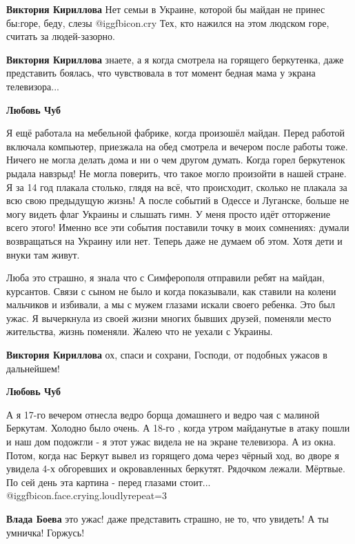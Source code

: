 \begin{itemize}
\begin{itemize}
\textbf{Виктория Кириллова} Нет семьи в Украине, которой бы майдан не принес бы:горе, беду, слезы @igg{fbicon.cry} Тех, кто нажился на этом людском горе, считать за людей-зазорно.

\textbf{Виктория Кириллова} знаете, а я когда смотрела на горящего беркутенка, даже представить боялась, что чувствовала в тот момент бедная мама у экрана телевизора...

\textbf{Любовь Чуб} 

Я ещё работала на мебельной фабрике, когда произошёл майдан. Перед работой
включала компьютер, приезжала на обед смотрела и вечером после работы тоже.
Ничего не могла делать дома и ни о чем другом думать. Когда горел беркутенок
рыдала навзрыд! Не могла поверить, что такое могло произойти в нашей стране. Я
за 14 год плакала столько, глядя на всё, что происходит, сколько не плакала за
всю свою предыдущую жизнь! А после событий в Одессе и Луганске, больше не могу
видеть флаг Украины и слышать гимн. У меня просто идёт отторжение всего этого!
Именно все эти события поставили точку в моих сомнениях: думали возвращаться на
Украину или нет. Теперь даже не думаем об этом. Хотя дети и внуки там живут.


Люба это страшно, я знала что с Симферополя отправили ребят на
майдан, курсантов. Связи с сыном не было и когда показывали, как ставили на
колени мальчиков и избивали, а мы с мужем глазами искали своего ребенка. Это был
ужас. Я вычеркнула из своей жизни многих бывших друзей, поменяли место
жительства, жизнь поменяли. Жалею что не уехали с Украины.

\textbf{Виктория Кириллова} ох, спаси и сохрани, Господи, от подобных ужасов в дальнейшем!

\textbf{Любовь Чуб} 

А я 17-го вечером отнесла ведро борща домашнего и ведро чая с малиной Беркутам.
Холодно было очень. А 18-го , когда утром майданутые в атаку пошли и наш дом
подожгли - я этот ужас видела не на экране телевизора. А из окна. Потом, когда
нас Беркут вывел из горящего дома через чёрный ход, во дворе я увидела 4-х
обгоревших и окровавленных беркутят. Рядочком лежали. Мёртвые. По сей день эта
картина - перед глазами стоит... @igg{fbicon.face.crying.loudly}{repeat=3} 

\textbf{Влада Боева} это ужас! даже представить страшно, не то, что увидеть!
А ты умничка! Горжусь!


\end{itemize}
\end{itemize}
